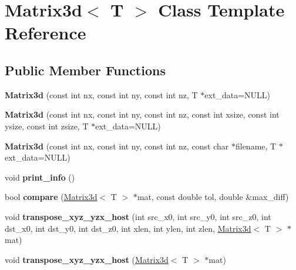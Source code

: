 \hypertarget{classMatrix3d}{}\section{Matrix3d$<$ T $>$ Class Template Reference}
\label{classMatrix3d}
\subsection*{Public Member Functions}
\begin{DoxyCompactItemize}
\item 
\hypertarget{classMatrix3d_ae6ce659b83ce95dbff6e0933fd41261a}{}\label{classMatrix3d_ae6ce659b83ce95dbff6e0933fd41261a} 
{\bfseries Matrix3d} (const int nx, const int ny, const int nz, T $\ast$ext\+\_\+data=N\+U\+LL)
\item 
\hypertarget{classMatrix3d_ab4c7123ef87e71b0f8a4fe2a6b473b6b}{}\label{classMatrix3d_ab4c7123ef87e71b0f8a4fe2a6b473b6b} 
{\bfseries Matrix3d} (const int nx, const int ny, const int nz, const int xsize, const int ysize, const int zsize, T $\ast$ext\+\_\+data=N\+U\+LL)
\item 
\hypertarget{classMatrix3d_a214fa561bafcef5629dc0a5a9162e7b6}{}\label{classMatrix3d_a214fa561bafcef5629dc0a5a9162e7b6} 
{\bfseries Matrix3d} (const int nx, const int ny, const int nz, const char $\ast$filename, T $\ast$ext\+\_\+data=N\+U\+LL)
\item 
\hypertarget{classMatrix3d_a0dc060b22881e4d074c9e43eeaebe657}{}\label{classMatrix3d_a0dc060b22881e4d074c9e43eeaebe657} 
void {\bfseries print\+\_\+info} ()
\item 
\hypertarget{classMatrix3d_a2015e215691333e3ee4fcf321b00ec7b}{}\label{classMatrix3d_a2015e215691333e3ee4fcf321b00ec7b} 
bool {\bfseries compare} (\hyperlink{classMatrix3d}{Matrix3d}$<$ T $>$ $\ast$mat, const double tol, double \&max\+\_\+diff)
\item 
\hypertarget{classMatrix3d_a452265f8fa98fcd7feaec3fcefddb828}{}\label{classMatrix3d_a452265f8fa98fcd7feaec3fcefddb828} 
void {\bfseries transpose\+\_\+xyz\+\_\+yzx\+\_\+host} (int src\+\_\+x0, int src\+\_\+y0, int src\+\_\+z0, int dst\+\_\+x0, int dst\+\_\+y0, int dst\+\_\+z0, int xlen, int ylen, int zlen, \hyperlink{classMatrix3d}{Matrix3d}$<$ T $>$ $\ast$mat)
\item 
\hypertarget{classMatrix3d_aca6bc24fdb30acae66f1f89b434bea6f}{}\label{classMatrix3d_aca6bc24fdb30acae66f1f89b434bea6f} 
void {\bfseries transpose\+\_\+xyz\+\_\+yzx\+\_\+host} (\hyperlink{classMatrix3d}{Matrix3d}$<$ T $>$ $\ast$mat)

\end{DoxyCompactItemize}
